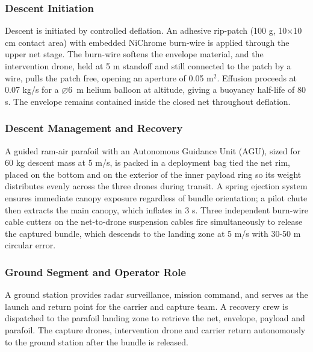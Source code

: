 \subsubsection{Descent Initiation}
Descent is initiated by controlled deflation. An adhesive rip-patch (100 g, 10$\times$10 cm contact area) with embedded NiChrome burn-wire is applied through the upper net stage. The burn-wire softens the envelope material, and the intervention drone, held at 5 m standoff and still connected to the patch by a wire, pulls the patch free, opening an aperture of 0.05 m$^2$. Effusion proceeds at 0.07 kg/s for a $\varnothing$6~m helium balloon at altitude, giving a buoyancy half-life of 80 s. The envelope remains contained inside the closed net throughout deflation.

\subsubsection{Descent Management and Recovery}
A guided ram-air parafoil with an Autonomous Guidance Unit (AGU), sized for 60 kg descent mass at 5 m/s, is packed in a deployment bag tied the net rim, placed on the bottom and on the exterior of the inner payload ring so its weight distributes evenly across the three drones during transit. A spring ejection system ensures immediate canopy exposure regardless of bundle orientation; a pilot chute then extracts the main canopy, which inflates in 3 s. Three independent burn-wire cable cutters on the net-to-drone suspension cables fire simultaneously to release the captured bundle, which descends to the landing zone at 5 m/s with 30-50 m circular error.

\subsubsection{Ground Segment and Operator Role}

A  ground station provides radar surveillance, mission command, and serves as the launch and return point for the carrier and capture team. A recovery crew is dispatched to the parafoil landing zone to retrieve the net, envelope, payload and parafoil. The capture drones, intervention drone and carrier return autonomously to the ground station after the bundle is released.



 
